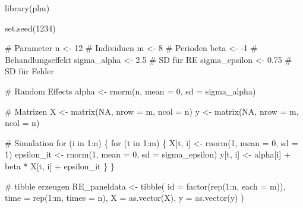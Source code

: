 \documentclass[
  a4paper,
  DIV=11,
  oneside]{scrreprt}
\newenvironment{Shaded}{\begin{snugshade}}{\end{snugshade}}
\newcommand{\AttributeTok}[1]{\textcolor[rgb]{0.40,0.45,0.13}{#1}}
\newcommand{\CommentTok}[1]{\textcolor[rgb]{0.37,0.37,0.37}{#1}}
\newcommand{\ConstantTok}[1]{\textcolor[rgb]{0.56,0.35,0.01}{#1}}
\newcommand{\ControlFlowTok}[1]{\textcolor[rgb]{0.00,0.23,0.31}{#1}}
\newcommand{\DecValTok}[1]{\textcolor[rgb]{0.68,0.00,0.00}{#1}}
\newcommand{\FloatTok}[1]{\textcolor[rgb]{0.68,0.00,0.00}{#1}}
\newcommand{\FunctionTok}[1]{\textcolor[rgb]{0.28,0.35,0.67}{#1}}
\newcommand{\NormalTok}[1]{\textcolor[rgb]{0.00,0.23,0.31}{#1}}
\newcommand{\OtherTok}[1]{\textcolor[rgb]{0.00,0.23,0.31}{#1}}
\newcommand{\SpecialCharTok}[1]{\textcolor[rgb]{0.37,0.37,0.37}{#1}}
\begin{document}
\begin{Shaded}
\begin{Highlighting}[]
\FunctionTok{library}\NormalTok{(plm)}

\FunctionTok{set.seed}\NormalTok{(}\DecValTok{1234}\NormalTok{)}

\CommentTok{\# Parameter}
\NormalTok{n }\OtherTok{\textless{}{-}} \DecValTok{12}  \CommentTok{\# Individuen}
\NormalTok{m }\OtherTok{\textless{}{-}} \DecValTok{8}   \CommentTok{\# Perioden}
\NormalTok{beta }\OtherTok{\textless{}{-}} \SpecialCharTok{{-}}\DecValTok{1} \CommentTok{\# Behandlungseffekt}
\NormalTok{sigma\_alpha }\OtherTok{\textless{}{-}} \FloatTok{2.5} \CommentTok{\# SD für RE}
\NormalTok{sigma\_epsilon }\OtherTok{\textless{}{-}} \FloatTok{0.75} \CommentTok{\# SD für Fehler}

\CommentTok{\# Random Effects}
\NormalTok{alpha }\OtherTok{\textless{}{-}} \FunctionTok{rnorm}\NormalTok{(n, }\AttributeTok{mean =} \DecValTok{0}\NormalTok{, }\AttributeTok{sd =}\NormalTok{ sigma\_alpha)}

\CommentTok{\# Matrizen}
\NormalTok{X }\OtherTok{\textless{}{-}} \FunctionTok{matrix}\NormalTok{(}\ConstantTok{NA}\NormalTok{, }\AttributeTok{nrow =}\NormalTok{ m, }\AttributeTok{ncol =}\NormalTok{ n)}
\NormalTok{y }\OtherTok{\textless{}{-}} \FunctionTok{matrix}\NormalTok{(}\ConstantTok{NA}\NormalTok{, }\AttributeTok{nrow =}\NormalTok{ m, }\AttributeTok{ncol =}\NormalTok{ n)}

\CommentTok{\# Simulation}
\ControlFlowTok{for}\NormalTok{ (i }\ControlFlowTok{in} \DecValTok{1}\SpecialCharTok{:}\NormalTok{n) \{}
  \ControlFlowTok{for}\NormalTok{ (t }\ControlFlowTok{in} \DecValTok{1}\SpecialCharTok{:}\NormalTok{m) \{}
\NormalTok{    X[t, i] }\OtherTok{\textless{}{-}} \FunctionTok{rnorm}\NormalTok{(}\DecValTok{1}\NormalTok{, }\AttributeTok{mean =} \DecValTok{0}\NormalTok{, }\AttributeTok{sd =} \DecValTok{1}\NormalTok{)}
\NormalTok{    epsilon\_it }\OtherTok{\textless{}{-}} \FunctionTok{rnorm}\NormalTok{(}\DecValTok{1}\NormalTok{, }\AttributeTok{mean =} \DecValTok{0}\NormalTok{, }\AttributeTok{sd =}\NormalTok{ sigma\_epsilon)}
\NormalTok{    y[t, i] }\OtherTok{\textless{}{-}}\NormalTok{ alpha[i] }\SpecialCharTok{+}\NormalTok{ beta }\SpecialCharTok{*}\NormalTok{ X[t, i] }\SpecialCharTok{+}\NormalTok{ epsilon\_it}
\NormalTok{  \}}
\NormalTok{\}}

\CommentTok{\# tibble erzeugen}
\NormalTok{RE\_paneldata }\OtherTok{\textless{}{-}} \FunctionTok{tibble}\NormalTok{(}
  \AttributeTok{id =} \FunctionTok{factor}\NormalTok{(}\FunctionTok{rep}\NormalTok{(}\DecValTok{1}\SpecialCharTok{:}\NormalTok{n, }\AttributeTok{each =}\NormalTok{ m)),}
  \AttributeTok{time =} \FunctionTok{rep}\NormalTok{(}\DecValTok{1}\SpecialCharTok{:}\NormalTok{m, }\AttributeTok{times =}\NormalTok{ n),}
  \AttributeTok{X =} \FunctionTok{as.vector}\NormalTok{(X),}
  \AttributeTok{y =} \FunctionTok{as.vector}\NormalTok{(y)}
\NormalTok{)}
\end{Highlighting}
\end{Shaded}
\end{document}
